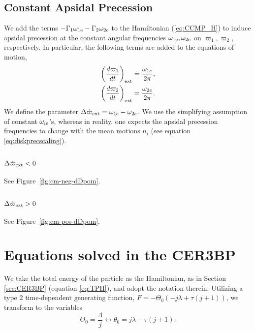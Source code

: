 \documentclass[usenatbib,twocolumn]{mnras}
\begin{document}
\subsection{Constant Apsidal Precession}
We add the terms $-\Gamma_1\omega_{1\rm e}-\Gamma_2\omega_{2\rm e}$ to the Hamiltonian (\ref{eq:CCMP_H}) to induce apsidal precession at the constant angular frequencies $\omega_{1\rm e},\omega_{2\rm e}$ on $\varpi_1,\varpi_2$, respectively. In particular, the following terms are added to the equations of motion,
\begin{align}
    \left(\frac{d\varpi_1 }{dt}\right)_{\rm ext} = \frac{\omega_{1e}}{2\pi}, \\
    \left(\frac{d\varpi_2 }{dt}\right)_{\rm ext} = \frac{\omega_{2e}}{2\pi}.
\end{align}
We define the parameter $\Delta\dot\varpi_{\rm ext} = \omega_{1\rm e}-\omega_{2\rm e}$.
We use the simplifying assumption of constant $\omega_{i\rm e}$'s, whereas in reality, one expects the apsidal precession frequencies to change with the mean motions $n_i$ (see equation \ref{eq:diskprecscaling}).

\subsubsection{$\Delta\dot\varpi_{\rm ext}<0$}
See Figure~\ref{fig:cm-neg-dDpom}.

\subsubsection{$\Delta\dot\varpi_{\rm ext}>0$}
See Figure~\ref{fig:cm-pos-dDpom}.








\clearpage


\clearpage
\onecolumn
\appendix
\section{Equations solved in the CER3BP}
We take the total energy of the particle as the Hamiltonian, as in Section \ref{sec:CER3BP} (equation \ref{eq:TPH}), and adopt the notation therein.
Utilizing a type 2 time-dependent generating function, $F=- \Theta_{0} \left(- j \lambda + \tau \left(j + 1\right)\right)$, we transform to the variables
\begin{equation}
    \Theta_{0} = \frac{\Lambda}{j} \longleftrightarrow
    \theta_0 = j \lambda - \tau \left(j + 1\right).
\end{equation}
\end{document}
